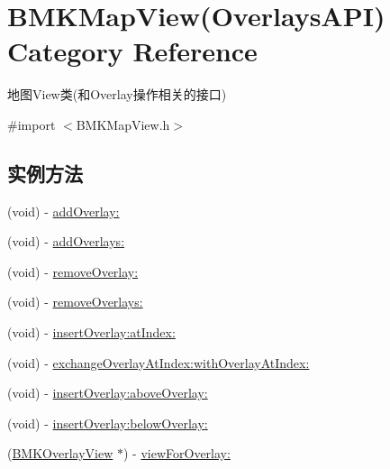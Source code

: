 \hypertarget{category_b_m_k_map_view_07_overlays_a_p_i_08}{\section{B\-M\-K\-Map\-View(Overlays\-A\-P\-I) Category Reference}
\label{category_b_m_k_map_view_07_overlays_a_p_i_08}
}


地图\-View类(和\-Overlay操作相关的接口)  




{\ttfamily \#import $<$B\-M\-K\-Map\-View.\-h$>$}

\subsection*{实例方法}
\begin{DoxyCompactItemize}
\item 
(void) -\/ \hyperlink{category_b_m_k_map_view_07_overlays_a_p_i_08_af85ad6091568df29d9e7c3dea82a1a2b}{add\-Overlay\-:}
\item 
(void) -\/ \hyperlink{category_b_m_k_map_view_07_overlays_a_p_i_08_ab7d29d948515cc6d947d6aa63f904168}{add\-Overlays\-:}
\item 
(void) -\/ \hyperlink{category_b_m_k_map_view_07_overlays_a_p_i_08_a3be1f2a019df3ff971f6a36f142e55be}{remove\-Overlay\-:}
\item 
(void) -\/ \hyperlink{category_b_m_k_map_view_07_overlays_a_p_i_08_a3eb7909fb1adce117c1de432fd5d816a}{remove\-Overlays\-:}
\item 
(void) -\/ \hyperlink{category_b_m_k_map_view_07_overlays_a_p_i_08_adc0775a2651c1e4099f93d9c1bbffe3d}{insert\-Overlay\-:at\-Index\-:}
\item 
(void) -\/ \hyperlink{category_b_m_k_map_view_07_overlays_a_p_i_08_a62c1c29b8e5b408ba0c40411a3c1f50f}{exchange\-Overlay\-At\-Index\-:with\-Overlay\-At\-Index\-:}
\item 
(void) -\/ \hyperlink{category_b_m_k_map_view_07_overlays_a_p_i_08_ad94b45c4df7978e3a6095918323496d3}{insert\-Overlay\-:above\-Overlay\-:}
\item 
(void) -\/ \hyperlink{category_b_m_k_map_view_07_overlays_a_p_i_08_a73dfe9f74d722b7b1fc477e791f34653}{insert\-Overlay\-:below\-Overlay\-:}
\item 
(\hyperlink{interface_b_m_k_overlay_view}{B\-M\-K\-Overlay\-View} $\ast$) -\/ \hyperlink{category_b_m_k_map_view_07_overlays_a_p_i_08_aa88093440ad22f7af9cf9a36051f662d}{view\-For\-Overlay\-:}
\end{DoxyCompactItemize}
